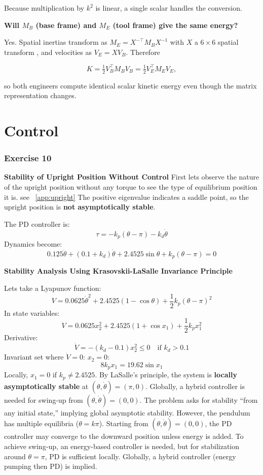 \documentclass[12pt,a4paper]{article}
\begin{document}
Because multiplication by $k^{2}$ is linear, a single scalar handles the conversion.

\textbf{Will $M_B$ (base frame) and $M_E$ (tool frame) give the same energy?}

Yes.  Spatial inertias transform as  
\(M_E = X^{-\!\top} M_B X^{-1}\)
with $X$ a $6\times6$ spatial transform
\cite[Eq.\,(3.15)]{Featherstone2014}, and velocities as
\(V_E = X V_B\).  Therefore  

\[
K
  = \tfrac12 V_B^{\!\top} M_B V_B
  = \tfrac12 V_E^{\!\top} M_E V_E,
\]

so both engineers compute identical scalar kinetic energy even though the
matrix representation changes.



\section{Control}
\subsubsection*{Exercise 10}
\textbf{Stability of Upright Position Without Control}
First lets observe the nature of the upright position without any torque to see the type of equilibrium position it is. see ~\ref{app:upright}
The positive eigenvalue indicates a saddle point, so the upright position is \textbf{not asymptotically stable}.

The PD controller is:
\[
\tau = -k_p (\theta - \pi) - k_d \dot{\theta}
\]
Dynamics become:
\[
0.125 \ddot{\theta} + (0.1 + k_d) \dot{\theta} + 2.4525 \sin \theta + k_p (\theta - \pi) = 0
\]

\textbf{Stability Analysis Using Krasovskii-LaSalle Invariance Principle ~\cite{Khalil2002}}

Lets take a Lyapunov function:
\[
V = 0.0625 \dot{\theta}^2 + 2.4525 (1 - \cos \theta) + \frac{1}{2} k_p (\theta - \pi)^2
\]
In state variables:
\[
V = 0.0625 x_2^2 + 2.4525 (1 + \cos x_1) + \frac{1}{2} k_p x_1^2
\]
Derivative:
\[
\dot{V} = -(k_d - 0.1) x_2^2 \leq 0 \quad \text{if } k_d > 0.1
\]
Invariant set where \(\dot{V} = 0\): \(x_2 = 0\):
\[
8 k_p x_1 = 19.62 \sin x_1
\]
Locally, \(x_1 = 0\) if \(k_p \neq 2.4525\). By LaSalle’s principle, the system is \textbf{locally asymptotically stable} at \((\theta, \dot{\theta}) = (\pi, 0)\). Globally, a hybrid controller is needed for swing-up from \((\theta, \dot{\theta}) = (0, 0)\).
The problem asks for stability “from any initial state,” implying global asymptotic stability. However, the pendulum has multiple equilibria ($\theta = k\pi$). Starting from $(\theta, \dot{\theta}) = (0, 0)$, the PD controller may converge to the downward position unless energy is added. To achieve swing-up, an energy-based controller is needed, but for stabilization around $\theta = \pi$, PD is sufficient locally. Globally, a hybrid controller (energy pumping then PD) is implied.
\end{document}
